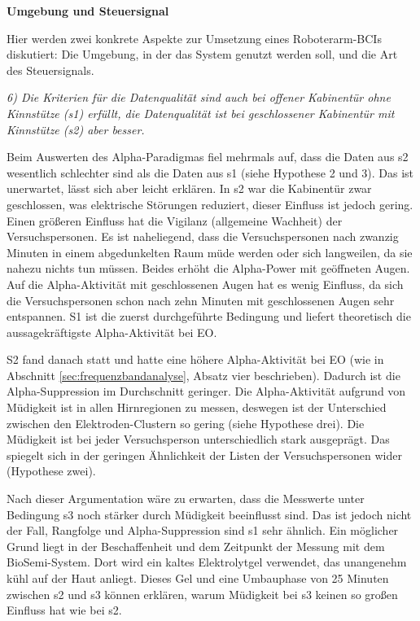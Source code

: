 \textbf{Umgebung und Steuersignal}

Hier werden zwei konkrete Aspekte zur Umsetzung eines Roboterarm-BCIs diskutiert: Die Umgebung, in der das System genutzt werden soll, und die Art des Steuersignals.

\textit{6) Die Kriterien für die Datenqualität sind auch bei offener Kabinentür ohne Kinnstütze (s1) erfüllt, die Datenqualität ist bei geschlossener Kabinentür mit Kinnstütze (s2) aber besser.}

Beim Auswerten des Alpha-Paradigmas fiel mehrmals auf, dass die Daten aus s2 wesentlich schlechter sind als die Daten aus s1 (siehe Hypothese 2 und 3). Das ist unerwartet, lässt sich aber leicht erklären. In s2 war die Kabinentür zwar geschlossen, was elektrische Störungen reduziert, dieser Einfluss ist jedoch gering. Einen größeren Einfluss hat die Vigilanz (allgemeine Wachheit) der Versuchspersonen. Es ist naheliegend, dass die Versuchspersonen nach zwanzig Minuten in einem abgedunkelten Raum müde werden oder sich langweilen, da sie nahezu nichts tun müssen. Beides erhöht die Alpha-Power mit geöffneten Augen. Auf die Alpha-Aktivität mit geschlossenen Augen hat es wenig Einfluss, da sich die Versuchspersonen schon nach zehn Minuten mit geschlossenen Augen sehr entspannen. S1 ist die zuerst durchgeführte Bedingung und liefert theoretisch die aussagekräftigste Alpha-Aktivität bei EO.

S2 fand danach statt und hatte eine höhere Alpha-Aktivität bei EO (wie in Abschnitt \ref{sec:frequenzbandanalyse}, Absatz vier beschrieben). Dadurch ist die Alpha-Suppression im Durchschnitt geringer. Die Alpha-Aktivität aufgrund von Müdigkeit ist in allen Hirnregionen zu messen, deswegen ist der Unterschied zwischen den Elektroden-Clustern so gering (siehe Hypothese drei). Die Müdigkeit ist bei jeder Versuchsperson unterschiedlich stark ausgeprägt. Das spiegelt sich in der geringen Ähnlichkeit der Listen der Versuchspersonen wider (Hypothese zwei).

Nach dieser Argumentation wäre zu erwarten, dass die Messwerte unter Bedingung s3 noch stärker durch Müdigkeit beeinflusst sind. Das ist jedoch nicht der Fall, Rangfolge und Alpha-Suppression sind s1 sehr ähnlich. Ein möglicher Grund liegt in der Beschaffenheit und dem Zeitpunkt der Messung mit dem BioSemi-System. Dort wird ein kaltes Elektrolytgel verwendet, das unangenehm kühl auf der Haut anliegt. Dieses Gel und eine Umbauphase von 25 Minuten zwischen s2 und s3 können erklären, warum Müdigkeit bei s3 keinen so großen Einfluss hat wie bei s2.

